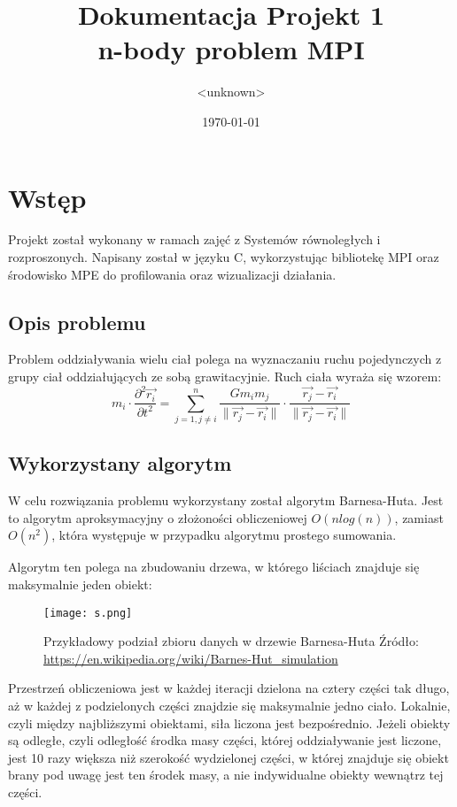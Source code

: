 \documentclass[11pt, titlepage]{article}
\title{Dokumentacja Projekt 1\\n-body problem MPI}
\date{\today}
\author{<unknown>}
\begin{document}
\maketitle

\section{Wstęp}
\hspace{11pt} Projekt został wykonany w ramach zajęć z Systemów równoległych i rozproszonych. Napisany został w języku C, wykorzystując bibliotekę MPI oraz środowisko MPE do profilowania oraz wizualizacji działania.
\subsection{Opis problemu}
\hspace{11pt} Problem oddziaływania wielu ciał polega na wyznaczaniu ruchu pojedynczych z grupy ciał oddziałujących ze sobą grawitacyjnie.
Ruch ciała wyraża się wzorem:
\begin{equation}
m_i \cdot \frac{\partial^2 \vec{r_i}}{\partial t^2} = \sum^n_{j=1, j\neq i} \frac{G m_i m_j}{\|\vec{r_j} - \vec{r_i}\|} \cdot \frac{\vec{r_j} - \vec{r_i}}{\|\vec{r_j} - \vec{r_i}\|}
\end{equation}
\subsection{Wykorzystany algorytm}
\hspace{11pt} W celu rozwiązania problemu wykorzystany został algorytm Barnesa-Huta. Jest to algorytm aproksymacyjny o złożoności obliczeniowej $O(n log(n))$, zamiast $O(n^2)$, która występuje w przypadku algorytmu prostego sumowania.

Algorytm ten polega na zbudowaniu drzewa, w którego liściach znajduje się maksymalnie jeden obiekt:
\begin{figure}[H]
\center
\caption{Przykładowy podział zbioru danych w drzewie Barnesa-Huta Źródło: \url{https://en.wikipedia.org/wiki/Barnes-Hut_simulation}}
\texttt{[image: s.png]}
\end{figure}

Przestrzeń obliczeniowa jest w każdej iteracji dzielona na cztery części tak długo, aż w każdej z podzielonych części znajdzie się maksymalnie jedno ciało. Lokalnie, czyli między najbliższymi obiektami, siła liczona jest bezpośrednio. Jeżeli obiekty są odległe, czyli odległość środka masy części, której oddziaływanie jest liczone, jest 10 razy większa niż szerokość wydzielonej części, w której znajduje się obiekt brany pod uwagę jest ten środek masy, a nie indywidualne obiekty wewnątrz tej części. 
\end{document}
